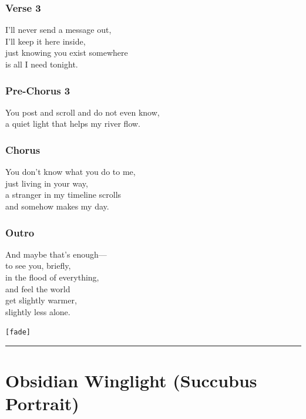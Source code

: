 \subsubsection{Verse 3}\label{verse-3-3}

I'll never send a message out,\\
I'll keep it here inside,\\
just knowing you exist somewhere\\
is all I need tonight.

\subsubsection{Pre-Chorus 3}\label{pre-chorus-3}

You post and scroll and do not even know,\\
a quiet light that helps my river flow.

\subsubsection{Chorus}\label{chorus-11}

You don't know what you do to me,\\
just living in your way,\\
a stranger in my timeline scrolls\\
and somehow makes my day.

\subsubsection{Outro}\label{outro-3}

And maybe that's enough---\\
to see you, briefly,\\
in the flood of everything,\\
and feel the world\\
get slightly warmer,\\
slightly less alone.

\texttt{{[}fade{]}}

\begin{center}\rule{0.5\linewidth}{0.5pt}\end{center}

\section{Obsidian Winglight (Succubus
Portrait)}\label{obsidian-winglight-succubus-portrait}

